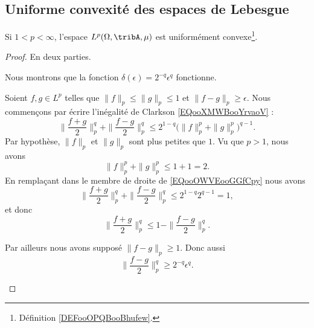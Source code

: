 	\subsection{Uniforme convexité des espaces de Lebesgue}

	\begin{proposition}     \label{PROPooFNLJooDlyIKV}
		Si \( 1<p<\infty\), l'espace \( L^p(\Omega,\tribA, \mu)\) est uniformément convexe\footnote{Définition \ref{DEFooOPQBooBhufew}.}.
	\end{proposition}

	\begin{proof}
		En deux parties.

		\begin{subproof}
			\spitem[\( 1<p\leq 2\)]
			Nous montrons que la fonction \( \delta(\epsilon)=2^{-q}\epsilon^q\) fonctionne.

			Soient \( f,g\in L^p\) telles que \( \| f \|_p\leq \| g \|_p\leq 1\) et \( \| f-g \|_p\geq \epsilon\). Nous commençons par écrire l'inégalité de Clarkson \eqref{EQooXMWBooYrvaoV} :
			\begin{equation}        \label{EQooOWVEooGGfCpy}
				\| \frac{ f+g }{2} \|_p^q+\| \frac{ f-g }{2} \|_p^q\leq 2^{1-q}\big( \| f \|_p^p+\| g \|_p^p \big)^{q-1}.
			\end{equation}
			Par hypothèse, \( \| f \|_p\) et \( \| g \|_p\) sont plus petites que \( 1\). Vu que \( p>1\), nous avons
			\begin{equation}
				\| f \|_p^p+\| g \|_p^p\leq 1+1=2.
			\end{equation}
			En remplaçant dans le membre de droite de \eqref{EQooOWVEooGGfCpy} nous avons
			\begin{equation}
				\| \frac{ f+g }{2} \|_p^q+\| \frac{ f-g }{2} \|_p^q\leq 2^{1-q}2^{q-1}=1,
			\end{equation}
			et donc
			\begin{equation}        \label{EQooKARVooDrOuJI}
				\| \frac{ f+g }{2} \|_p^q\leq 1-\| \frac{ f-g }{2} \|_p^q.
			\end{equation}

			Par ailleurs nous avons supposé \( \| f-g \|_p\geq 1\). Donc aussi
			\begin{equation}        \label{EQooCGDDooWtDokf}
				\| \frac{ f-g }{2} \|_p^q\geq 2^{-q}\epsilon^q.
			\end{equation}


\end{subproof}
\end{proof}
